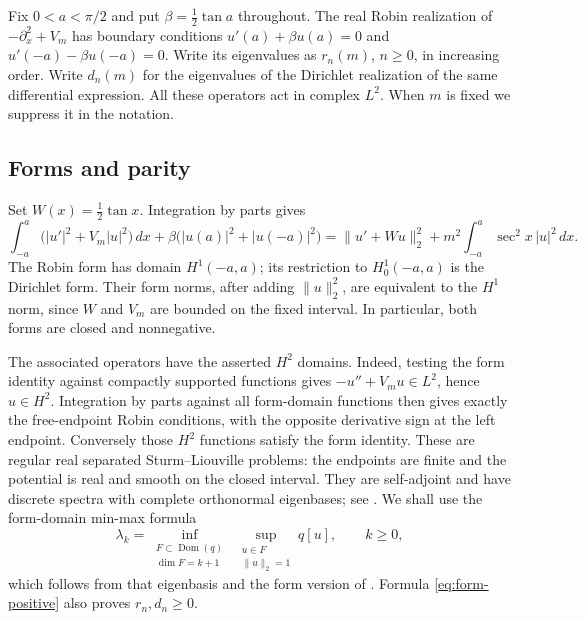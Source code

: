 \documentclass[11pt]{article}
\newcommand{\norm}[1]{\lVert#1\rVert}
\DeclareMathOperator{\Dom}{Dom}
\begin{document}
Fix $0<a<\pi/2$ and put $\beta=\tfrac12\tan a$ throughout.
The real Robin realization of $-\partial_x^2+V_m$ has boundary
conditions $u'(a)+\beta u(a)=0$ and $u'(-a)-\beta u(-a)=0$.
Write its eigenvalues as $r_n(m)$, $n\geq0$, in increasing order.
Write $d_n(m)$ for the eigenvalues of the Dirichlet realization of the
same differential expression. All these operators act in complex $L^2$.
When $m$ is fixed we suppress it in the notation.

\subsection{Forms and parity}

Set $W(x)=\tfrac12\tan x$. Integration by parts gives
\begin{equation}\label{eq:form-positive}
 \int_{-a}^a\bigl(|u'|^2+V_m|u|^2\bigr)\,dx
 +\beta\bigl(|u(a)|^2+|u(-a)|^2\bigr)
 =\norm{u'+Wu}_2^2+m^2\int_{-a}^a\sec^2x\,|u|^2\,dx.
\end{equation}
The Robin form has domain $H^1(-a,a)$; its restriction to
$H^1_0(-a,a)$ is the Dirichlet form. Their form norms, after adding
$\norm{u}_2^2$, are equivalent to the $H^1$ norm, since $W$ and $V_m$
are bounded on the fixed interval. In particular, both forms are closed
and nonnegative.

The associated operators have the asserted $H^2$ domains. Indeed, testing
the form identity against compactly supported functions gives
$-u''+V_mu\in L^2$, hence $u\in H^2$. Integration by parts against all
form-domain functions then gives exactly the free-endpoint Robin
conditions, with the opposite derivative sign at the left endpoint.
Conversely those $H^2$ functions satisfy the form identity. These are
regular real separated Sturm--Liouville problems: the endpoints are
finite and the potential is real and smooth on the closed interval.
They are self-adjoint and have discrete spectra with complete
orthonormal eigenbases; see \cite[Theorems 2.13, 9.6 and 9.10]{T}.
We shall use the form-domain min-max formula
\begin{equation}\label{eq:minmax}
 \lambda_k=\inf_{\substack{F\subset\Dom(q)\\\dim F=k+1}}
       \ \sup_{\substack{u\in F\\\norm{u}_2=1}}q[u],\qquad k\geq0,
\end{equation}
which follows from that eigenbasis and the form version of
\cite[Theorem 4.10]{T}. Formula \eqref{eq:form-positive} also proves
$r_n,d_n\geq0$.
\end{document}
